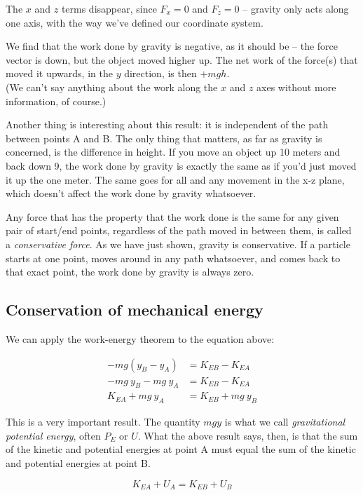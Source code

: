 \documentclass[12pt,a4paper]{report}
\begin{document}
The $x$ and $z$ terms disappear, since $F_x = 0$ and $F_z = 0$ -- gravity only acts along one axis, with the way we've defined our coordinate system.

We find that the work done by gravity is negative, as it should be -- the force vector is down, but the object moved higher up. The net work of the force(s) that moved it upwards, in the $y$ direction, is then $+ m g h$.\\
(We can't say anything about the work along the $x$ and $z$ axes without more information, of course.)

Another thing is interesting about this result: it is independent of the path between points A and B. The only thing that matters, as far as gravity is concerned, is the difference in height. If you move an object up 10 meters and back down 9, the work done by gravity is exactly the same as if you'd just moved it up the one meter. The same goes for all and any movement in the x-z plane, which doesn't affect the work done by gravity whatsoever.

Any force that has the property that the work done is the same for any given pair of start/end points, regardless of the path moved in between them, is called a \emph{conservative force}. As we have just shown, gravity is conservative. If a particle starts at one point, moves around in any path whatsoever, and comes back to that exact point, the work done by gravity is always zero.

\subsection{Conservation of mechanical energy}

We can apply the work-energy theorem to the equation above:

\begin{align}
-m g(y_B - y_A)& = K_{EB} - K_{EA}\\
-m g\ y_B - m g\ y_A &= K_{EB} - K_{EA}\\
K_{EA} + m g\ y_A &= K_{EB} + m g\ y_B
\end{align}

This is a very important result. The quantity $m g y$ is what we call \emph{gravitational potential energy}, often $P_E$ or $U$. What the above result says, then, is that the sum of the kinetic and potential energies at point A must equal the sum of the kinetic and potential energies at point B.

\begin{equation}
K_{EA} + U_A = K_{EB} + U_B
\end{equation}
\end{document}
